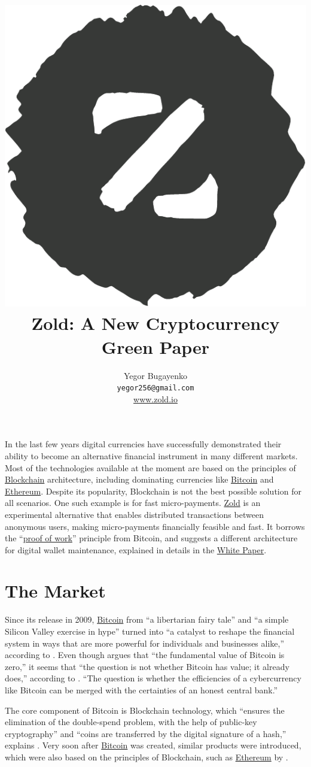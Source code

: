 \documentclass[12pt,oneside]{article}
\title{\includegraphics[scale=0.3]{../images/logo.pdf}\\Zold: A New Cryptocurrency\\\colorbox{green!30}{Green Paper}}
\author{Yegor Bugayenko\\
  \texttt{yegor256@gmail.com}\\
  \href{https://www.zold.io}{www.zold.io}\\[1em]
  \href{https://github.com/zold-io/papers/releases/tag/\zoldversion}{\texttt{\zoldversion}}}
\begin{document}
\raggedbottom

\maketitle

In the last few years digital currencies have successfully demonstrated
their ability to become an alternative financial instrument in many
different markets. Most of the technologies available at the moment are
based on the principles of \href{https://en.wikipedia.org/wiki/Blockchain}{Blockchain} architecture, including
dominating currencies like \href{https://bitcoin.org/}{Bitcoin} and
\href{https://ethereum.org/}{Ethereum}. Despite its
popularity, Blockchain is not the best possible solution for all scenarios.
One such example is for fast micro-payments.
\href{https://www.zold.io}{Zold} is an experimental alternative
that enables distributed transactions between
anonymous users, making micro-payments financially feasible and fast.
It borrows the ``\href{https://en.wikipedia.org/wiki/Proof-of-work_system}{proof of work}'' principle from Bitcoin,
and suggests a different architecture for digital wallet maintenance,
explained in details in the \href{https://papers.zold.io}{White Paper}.

\pagebreak

\section*{The Market}

Since its release in 2009, \href{https://bitcoin.org/}{Bitcoin} from
``a libertarian fairy tale'' and ``a simple Silicon Valley exercise in hype''
turned into ``a catalyst to reshape the financial system in ways that are more
powerful for individuals and businesses alike,'' according to .
Even though  argues that
``the fundamental value of Bitcoin is zero,''
it seems that ``the question is not whether Bitcoin has value; it already does,''
according to .
``The question is whether the efficiencies of a cybercurrency
like Bitcoin can be merged with the certainties of an honest central bank.''

The core component of Bitcoin is Blockchain technology, which
``ensures the elimination of the double-spend problem, with the help
of public-key cryptography'' and ``coins are transferred by the
digital signature of a hash,''
explains .
Very soon after \href{https://bitcoin.org/}{Bitcoin} was created, similar products were introduced,
which were also based on the principles of Blockchain, such as
\href{https://ethereum.org/}{Ethereum} by .
\end{document}
